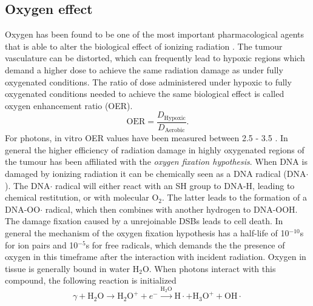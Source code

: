 \subsection{Oxygen effect}
Oxygen has been found to be one of the most important pharmacological agents that is able to alter the biological effect of ionizing radiation \cite{petry} \cite{mottram} \cite{pmid13106296}. The tumour vasculature can be distorted, which can frequently lead to hypoxic regions which demand a higher dose to achieve the same radiation damage as under fully oxygenated conditions. The ratio of dose administered under hypoxic to fully oxygenated conditions needed to achieve the same biological effect is called oxygen enhancement ratio (OER).
\begin{equation} 
\mathrm{OER} = \frac{D_{\mathrm{Hypoxic}}}{D_{\mathrm{Aerobic}}}.
\end{equation} 
For photons, in vitro OER values have been measured between 2.5 - 3.5 \cite{Hall}. In general the higher efficiency of radiation damage in highly oxygenated regions of the tumour has been affiliated with the \textit{oxygen fixation hypothesis}. When DNA is damaged by ionizing radiation it can be chemically seen as a DNA radical (DNA$\cdot$). The DNA$\cdot$ radical will either react with an SH group to DNA-H, leading to chemical restitution, or with molecular O$_2$. The latter leads to the formation of a DNA-OO$\cdot$ radical, which then combines with another hydrogen to DNA-OOH. The damage fixation caused by a unrejoinable DSBs leads to cell death. In general the mechanism of the oxygen fixation hypothesis has a half-life of 10$^{-10}$s for ion pairs and 10$^{-5}$s for free radicals, which demands the the presence of oxygen in this timeframe after the interaction with incident radiation. Oxygen in tissue is generally bound in water H$_2$O. When photons interact with this compound, the following reaction is initialized
\begin{equation}
\gamma + \mathrm{H}_2\mathrm{O}\rightarrow \mathrm{H}_2\mathrm{O}^+ + e^- \xrightarrow{\mathrm{H}_2\mathrm{O}} \mathrm{H}\cdot +\mathrm{H}_3\mathrm{O}^++\mathrm{OH}\cdot
\end{equation}
